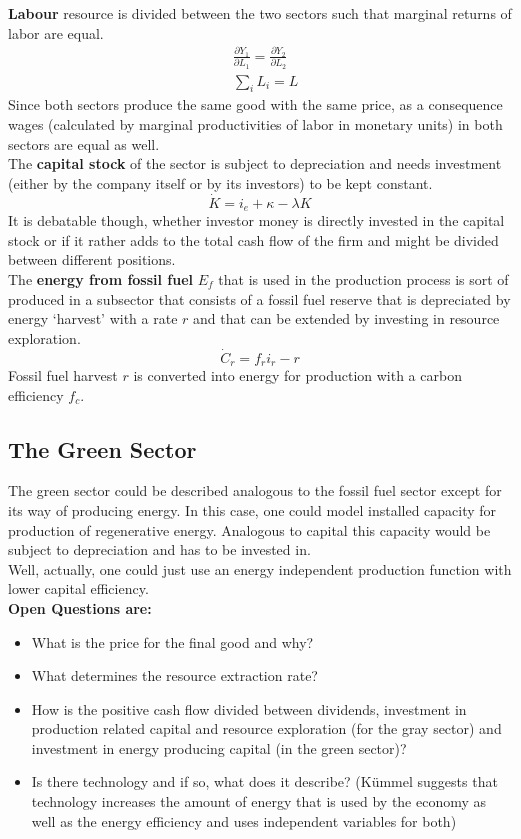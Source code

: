 \textbf{Labour} resource is divided between the two sectors such that marginal returns of labor are equal. 
\begin{align}
	&\frac{\partial Y_1}{\partial L_1} = \frac{\partial Y_2}{\partial L_2} \\
	&\sum\limits_i L_i = L
\end{align}
Since both sectors produce the same good with the same price, as a consequence wages (calculated by marginal productivities of labor in monetary units) in both sectors are equal as well. \\
The \textbf{capital stock} of the sector is subject to depreciation and needs investment (either by the company itself or by its investors) to be kept constant.
\begin{equation}
	\dot K = i_e + \kappa - \lambda K
	\label{capital_stock_dynamics}
\end{equation}
It is debatable though, whether investor money is directly invested in the capital stock or if it rather adds to the total cash flow of the firm and might be divided between different positions.\\
The \textbf{ energy from fossil fuel} $E_f$ that is used in the production process is sort of produced in a subsector that consists of a fossil fuel reserve that is depreciated by energy `harvest' with a rate $r$ and that can be extended by investing in resource exploration.
\begin{equation}
	\dot C_r = f_r i_r - r
	\label{fossil_reserve}
\end{equation}
Fossil fuel harvest $r$ is converted into energy for production with a carbon efficiency $f_c$.

\subsection{The Green Sector}
The green sector could be described analogous to the fossil fuel sector except for its way of producing energy. In this case, one could model installed capacity for production of regenerative energy. Analogous to capital this capacity would be subject to depreciation and has to be invested in. \\ Well, actually, one could just use an energy independent production function with lower capital efficiency.\\

\textbf{Open Questions are:}
\begin{itemize}
	\item What is the price for the final good and why?
	\item What determines the resource extraction rate?
	\item How is the positive cash flow divided between dividends, investment in production related capital and resource exploration (for the gray sector) and investment in energy producing capital (in the green sector)?
	\item Is there technology and if so, what does it describe? (K\"{u}mmel suggests that technology increases the amount of energy that is used by the economy as well as the energy efficiency and uses independent variables for both)
\end{itemize}


